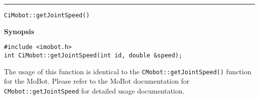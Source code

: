 \noindent
\vspace{5pt}
\rule{6.5in}{0.015in}
\noindent
{\LARGE \texttt{CiMobot::getJointSpeed()}}\\
{}

\noindent
{\bf Synopsis}\\
\begin{verbatim}
#include <imobot.h>
int CiMobot::getJointSpeed(int id, double &speed);
\end{verbatim}

The usage of this function is identical to the
\texttt{CMobot::getJointSpeed()} function for the MoBot. Please refer
to the MoBot documentation for \texttt{CMobot::getJointSpeed} for
detailed usage documentation.

